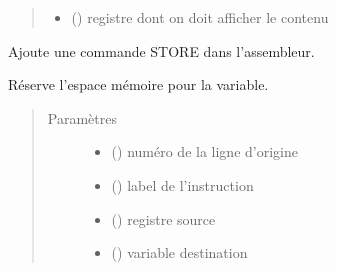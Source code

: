 \documentclass[letterpaper,10pt,french]{sphinxmanual}
\begin{document}
\begin{fulllineitems}
\begin{fulllineitems}
\begin{quote}
\begin{description}
\begin{itemize}
\item {} 
 () \textendash{} registre dont on doit afficher le contenu

\end{itemize}

\end{description}\end{quote}

\end{fulllineitems}


\begin{fulllineitems}
\label{\detokenize{assembleurcontainer:assembleurcontainer.AssembleurContainer.pushStore}}
Ajoute une commande STORE dans l’assembleur.

Réserve l’espace mémoire pour la variable.
\begin{quote}\begin{description}
\item[{Paramètres}] \leavevmode\begin{itemize}
\item {} 
 () \textendash{} numéro de la ligne d’origine

\item {} 
 (\sphinxstyleliteralemphasis{\sphinxupquote{{[}}}{\hyperref[\detokenize{label:label.Label}]{\sphinxcrossref{\sphinxstyleliteralemphasis{\sphinxupquote{Label}}}}}\sphinxstyleliteralemphasis{\sphinxupquote{{]}}}) \textendash{} label de l’instruction

\item {} 
 () \textendash{} registre source

\item {} 
 ({\hyperref[\detokenize{variable:variable.Variable}]{}}) \textendash{} variable destination


\end{itemize}
\end{description}
\end{quote}
\end{fulllineitems}
\end{fulllineitems}
\end{document}
